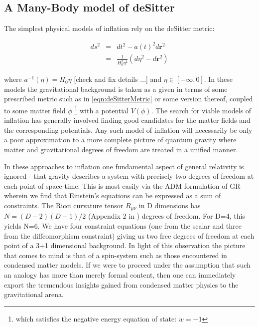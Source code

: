 \documentclass[11pt,english,rmp]{revtex4}
\begin{document}
\subsection{A Many-Body model of deSitter}

The simplest physical models of inflation rely on the deSitter metric:

\begin{eqnarray}
ds^{2} & = & dt^{2}-a(t)^{2}d\mathbf{r}^{2}\nonumber \\
 & = & \frac{1}{H_{0}^{2}\eta^{2}}(d\eta^{2}-d\mathbf{r}^{2})\end{eqnarray}


where $a^{-1}(\eta)=H_{0}\eta$ {[}check and fix details ...{]} and
$\eta\in[-\infty,0]$. In these models the gravitational background
is taken as a given in terms of some prescribed metric such as in
\ref{eqn:deSitterMetric} or some version thereof, coupled to some
matter field $\phi$\;%
\footnote{which satisfies the negative energy equation of state: $w=-1$%
} with a potential $V(\phi)$. The search for viable models of inflation
has generally involved finding good candidates for the matter fields
and the corresponding potentials. Any such model of inflation will
necessarily be only a poor approximation to a more complete picture
of quantum gravity where matter and gravitational degrees of freedom
are treated in a unified manner.

In these approaches to inflation one fundamental aspect of general
relativity is ignored - that gravity describes a system with precisely
two degrees of freedom at each point of space-time. This is most easily
via the ADM formulation of GR wherein we find that Einstein's equations
can be expressed as a sum of constraints. The Ricci curvature tensor
$R_{\mu\nu}$ in D dimensions has $N=(D-2)(D-1)/2$ (Appendix 2 in \cite{Wald1984General}) degrees of freedom. For D=4, this yields N=6. We have
four constraint equations (one from the scalar and three from the
diffeomorphism constraint) giving us two free degrees of freedom at
each point of a 3+1 dimensional background. In light of this observation
the picture that comes to mind is that of a spin-system such as those
encountered in condensed matter models. If we were to proceed under
the assumption that such an analogy has more than merely formal content,
then one can immediately export the tremendous insights gained from
condensed matter physics to the gravitational arena.
\end{document}
